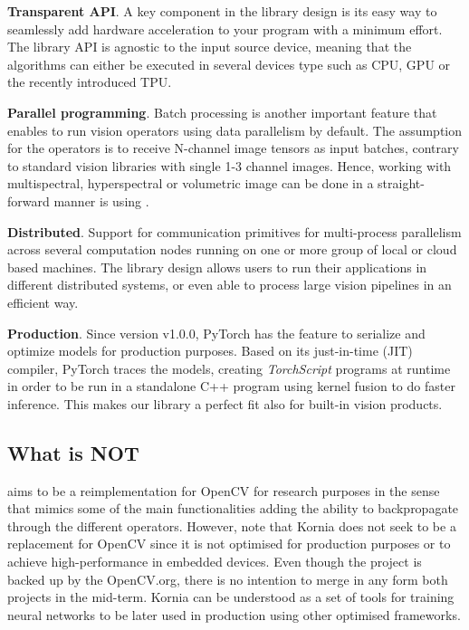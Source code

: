 \textbf{Transparent API}. A key component in the library design is its easy way to seamlessly add hardware acceleration to your program with a minimum effort. The library API is agnostic to the input source device, meaning that the algorithms can either be executed in several devices type such as CPU, GPU or the recently introduced TPU.

\textbf{Parallel programming}. Batch processing is another important feature that enables to run vision operators using data parallelism by default. The assumption for the operators is to receive N-channel image tensors as input batches, contrary to standard vision libraries with single 1-3 channel images. Hence, working with multispectral, hyperspectral or volumetric image can be done in a straight-forward manner is using \lib{}.

\textbf{Distributed}. Support for communication primitives for multi-process parallelism across several computation nodes running on one or more group of local or cloud based machines. The library design allows users to run their applications in different distributed systems, or even able to process large vision pipelines in an efficient way.

\textbf{Production}. Since version v1.0.0, PyTorch has the feature to serialize and optimize models for production purposes. Based on its just-in-time (JIT) compiler, PyTorch traces the models, creating \textit{TorchScript} programs at runtime in order to be run in a standalone C++ program using kernel fusion to do faster inference. This makes our library a perfect fit also for built-in vision products.

\subsection*{What \lib \hspace{1px} is NOT}

\lib{} aims to be a reimplementation for OpenCV for research purposes in the sense that mimics some of the main functionalities adding the ability to backpropagate through the different operators. However, note that Kornia does not seek to be a replacement for OpenCV since it is not optimised for production purposes or to achieve  high-performance in embedded devices. Even though the project is backed up by the OpenCV.org, there is no intention to merge in any form both projects in the mid-term. Kornia can be understood as a set of tools for training neural networks to be later used in production using other optimised frameworks.

